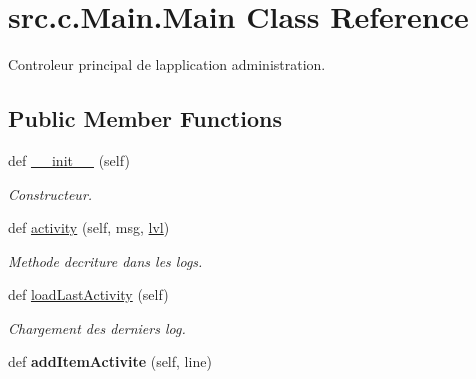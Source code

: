 \hypertarget{classsrc_1_1c_1_1_main_1_1_main}{}\section{src.\+c.\+Main.\+Main Class Reference}
\label{classsrc_1_1c_1_1_main_1_1_main}


Controleur principal de l\textquotesingle{}application administration.  


\subsection*{Public Member Functions}
\begin{DoxyCompactItemize}
\item 
\hypertarget{classsrc_1_1c_1_1_main_1_1_main_a585fd94e270de94b3ccd2ef91208a8e5}{}def \hyperlink{classsrc_1_1c_1_1_main_1_1_main_a585fd94e270de94b3ccd2ef91208a8e5}{\+\_\+\+\_\+init\+\_\+\+\_\+} (self)\label{classsrc_1_1c_1_1_main_1_1_main_a585fd94e270de94b3ccd2ef91208a8e5}

\begin{DoxyCompactList}\small\item\em Constructeur. \end{DoxyCompactList}\item 
def \hyperlink{classsrc_1_1c_1_1_main_1_1_main_ac1e2435061caca404e6d9c88aefe5fa6}{activity} (self, msg, \hyperlink{classsrc_1_1c_1_1utils_1_1log_1_1lvl}{lvl})
\begin{DoxyCompactList}\small\item\em Methode d\textquotesingle{}ecriture dans les logs. \end{DoxyCompactList}\item 
\hypertarget{classsrc_1_1c_1_1_main_1_1_main_ae77e66f9b7c5610246aac07974d1861d}{}def \hyperlink{classsrc_1_1c_1_1_main_1_1_main_ae77e66f9b7c5610246aac07974d1861d}{load\+Last\+Activity} (self)\label{classsrc_1_1c_1_1_main_1_1_main_ae77e66f9b7c5610246aac07974d1861d}

\begin{DoxyCompactList}\small\item\em Chargement des derniers log. \end{DoxyCompactList}\item 
\hypertarget{classsrc_1_1c_1_1_main_1_1_main_a41d16ee08c9c464328a48bca3ead1e1c}{}def {\bfseries add\+Item\+Activite} (self, line)\label{classsrc_1_1c_1_1_main_1_1_main_a41d16ee08c9c464328a48bca3ead1e1c}


\end{DoxyCompactItemize}
